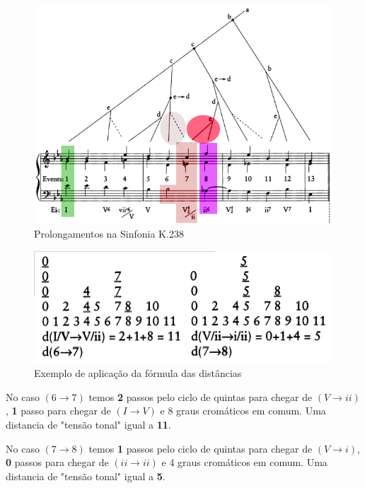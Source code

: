 \documentclass[
	12pt,				%
	openright,			%
	twoside,			%
	a4paper,			%
	english,			%
	french,				%
	spanish,			%
	brazil				%
	]{abntex2}
\begin{document}
\begin{figure}[htb]
	\caption{\label{fig_grafico}Prolongamentos na Sinfonia K.238 }
	\begin{center}
	    \includegraphics[scale=0.6]{lerdahl/calculating_prolongamento.png}
	\end{center}
\end{figure}

\pagebreak
\begin{figure}[htb]
	\caption{\label{fig_grafico}Exemplo de aplicação da fórmula das distâncias }
	\begin{center}
	    \includegraphics[scale=0.6]{lerdahl/pitchspace-K282.png}
	\end{center}
\end{figure}

No caso $(6 \to 7)$ temos \textbf{2} passos pelo ciclo de quintas para chegar de $(V \to ii)$, \textbf{1} passo para chegar de $(I \to V)$ e 8 graus cromáticos em comum. Uma distancia de "tensão tonal" igual a \textbf{11}.

No caso $(7 \to 8)$ temos \textbf{1} passos pelo ciclo de quintas para chegar de $(V \to i)$, \textbf{0} passos para chegar de $(ii \to ii)$ e 4 graus cromáticos em comum. Uma distancia de "tensão tonal" igual a \textbf{5}.
\end{document}
